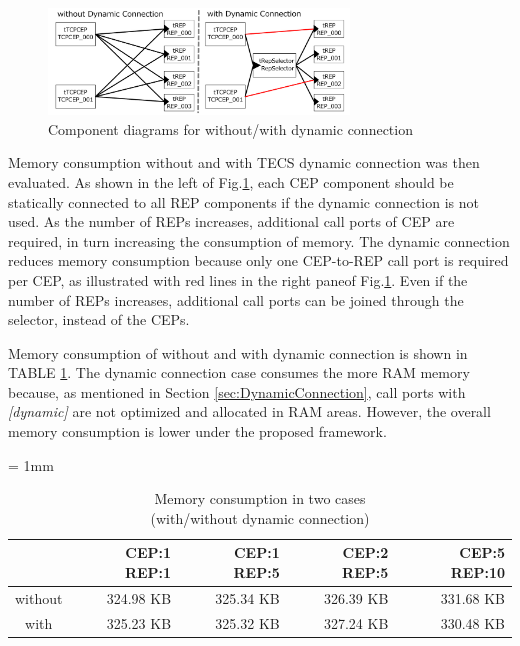\documentclass[JIP]{ipsj_v2/UTF8/ipsj}
\begin{document}
\begin{figure}[t]
    \centering
    \includegraphics[width=8cm,clip]{figure/ComparisonOfDynamicConnection.pdf}
    \caption{Component diagrams for without/with dynamic connection}
    \label{fig:ComparisonOfDynamicConnection}
\end{figure}

Memory consumption without and with TECS dynamic connection was then evaluated.
As shown in the left of Fig.\ref{fig:ComparisonOfDynamicConnection}, each CEP component should be statically connected to all REP components if the dynamic connection is not used.
As the number of REPs increases, additional call ports of CEP are required, in turn increasing the consumption of memory. 
The dynamic connection reduces memory consumption because only one CEP-to-REP call port is required per CEP, as illustrated with red lines in the right paneof Fig.\ref{fig:ComparisonOfDynamicConnection}.
Even if the number of REPs increases, additional call ports can be joined through the selector, instead of the CEPs.

Memory consumption of without and with dynamic connection is shown in TABLE \ref{fig:EvaluationOfDynamicConnection}.
The dynamic connection case consumes the more RAM memory because, as mentioned in Section \ref{sec:DynamicConnection}, call ports with {\it [dynamic]} are not optimized and allocated in RAM areas.
However, the overall memory consumption is lower under the proposed framework.

\begin{table}[t]
    \centering
    \caption{Memory consumption in two cases\\(with/without dynamic connection)}
    {\tabcolsep = 1mm
    \begin{tabular}{c|r|r|r|r}
        \hline\hline
                &  CEP:1 REP:1 & CEP:1 REP:5 & CEP:2 REP:5 & CEP:5 REP:10 \\ \hline
        without &  324.98 KB   & 325.34 KB   & 326.39 KB   & 331.68 KB   \\
        with    &  325.23 KB   & 325.32 KB   & 327.24 KB   & 330.48 KB   \\
        \hline
    \end{tabular}
    }
    \label{fig:EvaluationOfDynamicConnection}
\end{table}
\end{document}

